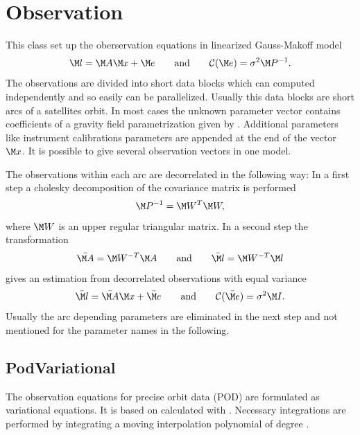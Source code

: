 \clearpage

\section{Observation}\label{observationType}
This class set up the oberservation equations in linearized Gauss-Makoff model
\begin{equation}\label{gmm}
\M l  = \M A \M x + \M e\qquad\text{and}\qquad\mathcal{C}(\M e) = \sigma^2\M P^{-1}.
\end{equation}
The observations are divided into short data blocks which can computed independently
and so easily can be parallelized. Usually this data blocks are short arcs of a
satellites orbit. In most cases the unknown parameter vector contains coefficients
of a gravity field parametrization given by .
Additional parameters like instrument calibrations parameters are appended at the
end of the vector~$\M x$.
It is possible to give several observation vectors in one model.

The observations within each arc are decorrelated in the following way:
In a first step a cholesky decomposition of the covariance matrix is performed
\begin{equation}
\M P^{-1} = \M W^T\M W,
\end{equation}
where $\M W$ is an upper regular triangular matrix.
In a second step the transformation
\begin{equation}\label{dekorrelierung}
\bar{\M A} = \M W^{-T}\M A\qquad\text{and}\qquad \bar{\M l} = \M W^{-T}\M l
\end{equation}
gives an estimation from decorrelated observations with equal variance
\begin{equation}\label{normal.GMM}
\bar{\M l} = \bar{\M A} \M x + \bar{\M e}
\qquad\text{and}\qquad
\mathcal{C}(\bar{\M e})= \sigma^2 \M I.
\end{equation}
Usually the arc depending parameters are eliminated in the next step
and not mentioned for the parameter names in the following.


\subsection{PodVariational}\label{observationType:podVariational}
The observation equations for precise orbit data (POD) are formulated as variational equations.
It is based on  calculated with .
Necessary integrations are performed by integrating a moving interpolation polynomial of degree .

